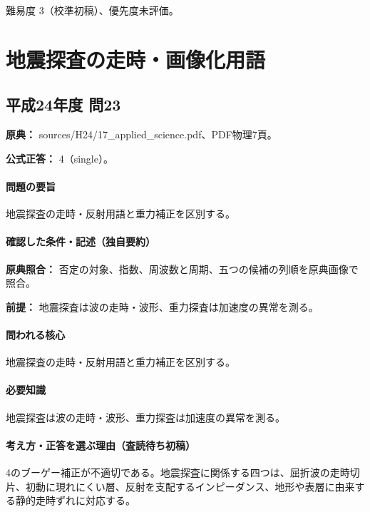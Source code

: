 \par 難易度 3（校準初稿）、優先度未評価。

\section{地震探査の走時・画像化用語}

\subsection{平成24年度 問23}
\label{q:h24-reg-applied-23}

\noindent\textbf{原典：} sources/H24/17\_applied\_science.pdf、PDF物理7頁。

\textbf{公式正答：} 4（single）。

\paragraph{問題の要旨} 地震探査の走時・反射用語と重力補正を区別する。

\paragraph{確認した条件・記述（独自要約）}\mbox{}\par

\noindent\textbf{原典照合：} 否定の対象、指数、周波数と周期、五つの候補の列順を原典画像で照合。\par

\noindent\textbf{前提：} 地震探査は波の走時・波形、重力探査は加速度の異常を測る。\par

\paragraph{問われる核心} 地震探査の走時・反射用語と重力補正を区別する。

\paragraph{必要知識} 地震探査は波の走時・波形、重力探査は加速度の異常を測る。

\paragraph{考え方・正答を選ぶ理由（査読待ち初稿）} 4のブーゲー補正が不適切である。地震探査に関係する四つは、屈折波の走時切片、初動に現れにくい層、反射を支配するインピーダンス、地形や表層に由来する静的走時ずれに対応する。

